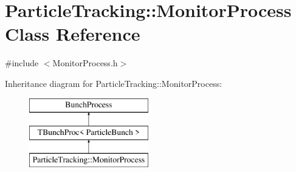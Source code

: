 \hypertarget{classParticleTracking_1_1MonitorProcess}{}\section{Particle\+Tracking\+:\+:Monitor\+Process Class Reference}
\label{classParticleTracking_1_1MonitorProcess}


{\ttfamily \#include $<$Monitor\+Process.\+h$>$}

Inheritance diagram for Particle\+Tracking\+:\+:Monitor\+Process\+:\begin{figure}[H]
\begin{center}
\leavevmode
\includegraphics[height=3.000000cm]{classParticleTracking_1_1MonitorProcess}
\end{center}
\end{figure}
